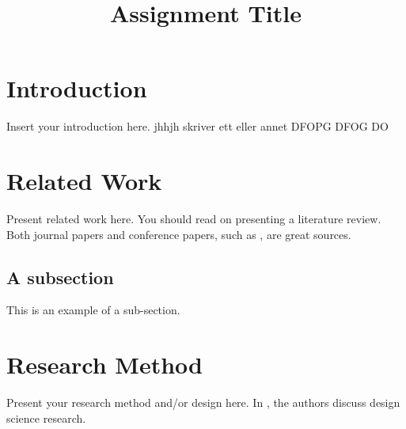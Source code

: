 \documentclass[fleqn,10pt]{wlscirep}
\title{Assignment Title}
\author{}
\begin{document}





\flushbottom
\maketitle


\section{Introduction}
Insert your introduction here. jhhjh
skriver ett eller annet
DFOPG DFOG DO

\section{Related Work}
Present related work here. 
You should read \cite{Webster2002-pw} on presenting a literature review.
Both journal papers and conference papers, such as \cite{Dingsoyr2014-xt}, are great sources.

\subsection{A subsection}
This is an example of a sub-section.

\section{Research Method}
Present your research method and/or design here. 
In \cite{Hevner2010-yw}, the authors discuss design science research.
\end{document}
